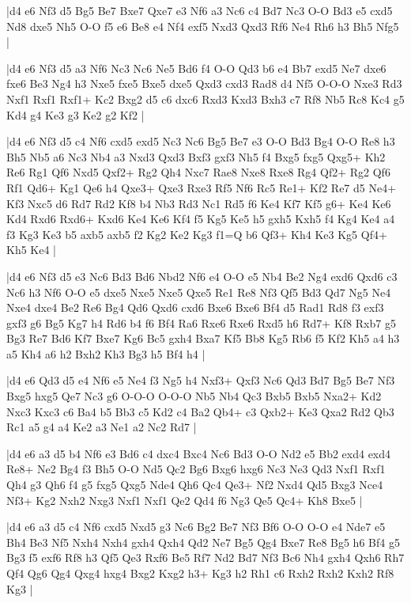 \whitename{}
\blackname{}
\makegametitle
|d4 e6 Nf3 d5 Bg5 Be7 Bxe7 Qxe7 e3 Nf6 a3 Nc6 c4 Bd7 Nc3 O-O Bd3 e5 cxd5 Nd8 dxe5 Nh5 O-O f5 e6 Be8 e4 Nf4 exf5 Nxd3 Qxd3 Rf6 Ne4 Rh6 h3 Bh5 Nfg5  |

\whitename{}
\blackname{}
\makegametitle
|d4 e6 Nf3 d5 a3 Nf6 Nc3 Nc6 Ne5 Bd6 f4 O-O Qd3 b6 e4 Bb7 exd5 Ne7 dxe6 fxe6 Be3 Ng4 h3 Nxe5 fxe5 Bxe5 dxe5 Qxd3 cxd3 Rad8 d4 Nf5 O-O-O Nxe3 Rd3 Nxf1 Rxf1 Rxf1+ Kc2 Bxg2 d5 c6 dxc6 Rxd3 Kxd3 Bxh3 c7 Rf8 Nb5 Rc8 Kc4 g5 Kd4 g4 Ke3 g3 Ke2 g2 Kf2  |

\whitename{}
\blackname{}
\makegametitle
|d4 e6 Nf3 d5 c4 Nf6 cxd5 exd5 Nc3 Nc6 Bg5 Be7 e3 O-O Bd3 Bg4 O-O Re8 h3 Bh5 Nb5 a6 Nc3 Nb4 a3 Nxd3 Qxd3 Bxf3 gxf3 Nh5 f4 Bxg5 fxg5 Qxg5+ Kh2 Re6 Rg1 Qf6 Nxd5 Qxf2+ Rg2 Qh4 Nxc7 Rae8 Nxe8 Rxe8 Rg4 Qf2+ Rg2 Qf6 Rf1 Qd6+ Kg1 Qe6 h4 Qxe3+ Qxe3 Rxe3 Rf5 Nf6 Rc5 Re1+ Kf2 Re7 d5 Ne4+ Kf3 Nxc5 d6 Rd7 Rd2 Kf8 b4 Nb3 Rd3 Nc1 Rd5 f6 Ke4 Kf7 Kf5 g6+ Ke4 Ke6 Kd4 Rxd6 Rxd6+ Kxd6 Ke4 Ke6 Kf4 f5 Kg5 Ke5 h5 gxh5 Kxh5 f4 Kg4 Ke4 a4 f3 Kg3 Ke3 b5 axb5 axb5 f2 Kg2 Ke2 Kg3 f1=Q b6 Qf3+ Kh4 Ke3 Kg5 Qf4+ Kh5 Ke4  |

\whitename{}
\blackname{}
\makegametitle
|d4 e6 Nf3 d5 e3 Nc6 Bd3 Bd6 Nbd2 Nf6 e4 O-O e5 Nb4 Be2 Ng4 exd6 Qxd6 c3 Nc6 h3 Nf6 O-O e5 dxe5 Nxe5 Nxe5 Qxe5 Re1 Re8 Nf3 Qf5 Bd3 Qd7 Ng5 Ne4 Nxe4 dxe4 Be2 Re6 Bg4 Qd6 Qxd6 cxd6 Bxe6 Bxe6 Bf4 d5 Rad1 Rd8 f3 exf3 gxf3 g6 Bg5 Kg7 h4 Rd6 b4 f6 Bf4 Ra6 Rxe6 Rxe6 Rxd5 h6 Rd7+ Kf8 Rxb7 g5 Bg3 Re7 Bd6 Kf7 Bxe7 Kg6 Bc5 gxh4 Bxa7 Kf5 Bb8 Kg5 Rb6 f5 Kf2 Kh5 a4 h3 a5 Kh4 a6 h2 Bxh2 Kh3 Bg3 h5 Bf4 h4  |

\whitename{}
\blackname{}
\makegametitle
|d4 e6 Qd3 d5 e4 Nf6 e5 Ne4 f3 Ng5 h4 Nxf3+ Qxf3 Nc6 Qd3 Bd7 Bg5 Be7 Nf3 Bxg5 hxg5 Qe7 Nc3 g6 O-O-O O-O-O Nb5 Nb4 Qc3 Bxb5 Bxb5 Nxa2+ Kd2 Nxc3 Kxc3 c6 Ba4 b5 Bb3 c5 Kd2 c4 Ba2 Qb4+ c3 Qxb2+ Ke3 Qxa2 Rd2 Qb3 Rc1 a5 g4 a4 Ke2 a3 Ne1 a2 Nc2 Rd7  |

\whitename{}
\blackname{}
\makegametitle
|d4 e6 a3 d5 b4 Nf6 e3 Bd6 c4 dxc4 Bxc4 Nc6 Bd3 O-O Nd2 e5 Bb2 exd4 exd4 Re8+ Ne2 Bg4 f3 Bh5 O-O Nd5 Qc2 Bg6 Bxg6 hxg6 Nc3 Ne3 Qd3 Nxf1 Rxf1 Qh4 g3 Qh6 f4 g5 fxg5 Qxg5 Nde4 Qh6 Qc4 Qe3+ Nf2 Nxd4 Qd5 Bxg3 Nce4 Nf3+ Kg2 Nxh2 Nxg3 Nxf1 Nxf1 Qe2 Qd4 f6 Ng3 Qe5 Qc4+ Kh8 Bxe5  |

\whitename{}
\blackname{}
\makegametitle
|d4 e6 a3 d5 c4 Nf6 cxd5 Nxd5 g3 Nc6 Bg2 Be7 Nf3 Bf6 O-O O-O e4 Nde7 e5 Bh4 Be3 Nf5 Nxh4 Nxh4 gxh4 Qxh4 Qd2 Ne7 Bg5 Qg4 Bxe7 Re8 Bg5 h6 Bf4 g5 Bg3 f5 exf6 Rf8 h3 Qf5 Qe3 Rxf6 Be5 Rf7 Nd2 Bd7 Nf3 Bc6 Nh4 gxh4 Qxh6 Rh7 Qf4 Qg6 Qg4 Qxg4 hxg4 Bxg2 Kxg2 h3+ Kg3 h2 Rh1 c6 Rxh2 Rxh2 Kxh2 Rf8 Kg3  |

